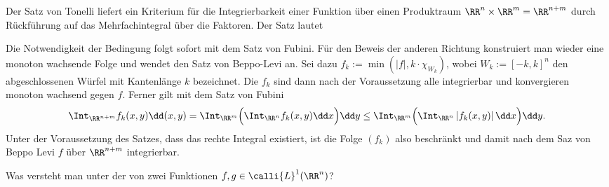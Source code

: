 \begin{antwort}
  Der Satz von Tonelli liefert ein Kriterium für die Integrierbarkeit 
  einer Funktion über einen Produktraum $\RR^n\times \RR^m=\RR^{n+m}$ 
  durch Rückführung auf das Mehrfachintegral über die Faktoren. Der Satz 
  lautet

  \medskip
  \noindent{}

  \medskip\noindent%
  Die Notwendigkeit der Bedingung folgt sofort mit dem Satz von Fubini. Für den 
  Beweis der anderen Richtung konstruiert man wieder eine monoton wachsende 
  Folge und wendet den Satz von Beppo-Levi an. Sei dazu 
  $f_k := \min \left( |f|, k \cdot \chi_{W_k} \right)$, wobei $W_k := [-k,k]^n$ 
  den abgeschlossenen Würfel mit Kantenlänge $k$ bezeichnet. Die $f_k$ sind dann 
  nach der Voraussetzung alle integrierbar und konvergieren monoton wachsend 
  gegen $f$. Ferner gilt mit dem Satz von Fubini
  \[
  \Int_{\RR^{n+m}} f_k(x,y) \dd (x,y) =
  \Int_{\RR^m} \Big( \Int_{\RR^n} f_k(x,y) \dd x \Big) \dd y \le  
  \Int_{\RR^m} \Big( \Int_{\RR^n} \left| f_k(x,y) \right| \dd x \Big) \dd y.
  \]
  Unter der Voraussetzung des Satzes, 
  dass das rechte Integral existiert, ist die Folge $(f_k)$ also beschränkt und damit 
  nach dem Saz von Beppo Levi $f$ über $\RR^{n+m}$ integrierbar. \AntEnd  
\end{antwort} 

\begin{frage}
  Was versteht man unter der  von zwei Funktionen 
  $f, g \in  \calli{L}^1 (\RR^n )$?
\end{frage}

